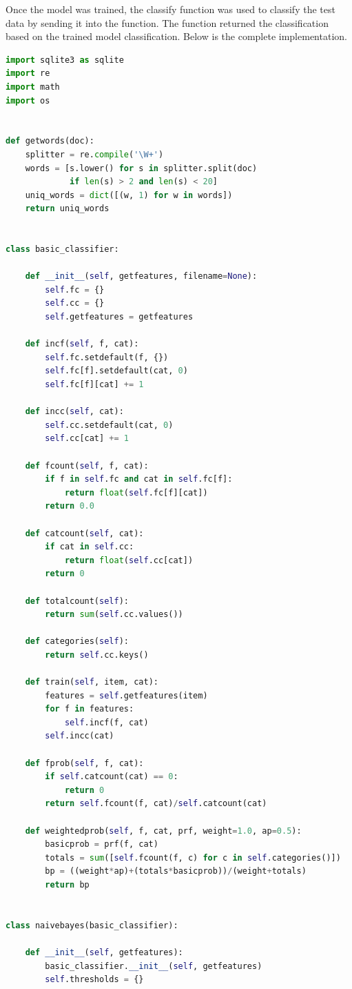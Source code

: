 \documentclass[12pt]{article}
\begin{document}
Once the model was trained, the classify function was used to classify the test data by sending it into the function. The function returned the classification based on the trained model classification. Below is the complete implementation.
\\
\begin{lstlisting}[language=Python, caption=Email Classification Using Naive Bayes Classifier] 
import sqlite3 as sqlite
import re
import math
import os


def getwords(doc):
    splitter = re.compile('\W+')
    words = [s.lower() for s in splitter.split(doc)
             if len(s) > 2 and len(s) < 20]
    uniq_words = dict([(w, 1) for w in words])
    return uniq_words


class basic_classifier:

    def __init__(self, getfeatures, filename=None):
        self.fc = {}
        self.cc = {}
        self.getfeatures = getfeatures

    def incf(self, f, cat):
        self.fc.setdefault(f, {})
        self.fc[f].setdefault(cat, 0)
        self.fc[f][cat] += 1

    def incc(self, cat):
        self.cc.setdefault(cat, 0)
        self.cc[cat] += 1

    def fcount(self, f, cat):
        if f in self.fc and cat in self.fc[f]:
            return float(self.fc[f][cat])
        return 0.0

    def catcount(self, cat):
        if cat in self.cc:
            return float(self.cc[cat])
        return 0

    def totalcount(self):
        return sum(self.cc.values())

    def categories(self):
        return self.cc.keys()

    def train(self, item, cat):
        features = self.getfeatures(item)
        for f in features:
            self.incf(f, cat)
        self.incc(cat)

    def fprob(self, f, cat):
        if self.catcount(cat) == 0:
            return 0
        return self.fcount(f, cat)/self.catcount(cat)

    def weightedprob(self, f, cat, prf, weight=1.0, ap=0.5):
        basicprob = prf(f, cat)
        totals = sum([self.fcount(f, c) for c in self.categories()])
        bp = ((weight*ap)+(totals*basicprob))/(weight+totals)
        return bp


class naivebayes(basic_classifier):

    def __init__(self, getfeatures):
        basic_classifier.__init__(self, getfeatures)
        self.thresholds = {}


\end{lstlisting}
\end{document}
